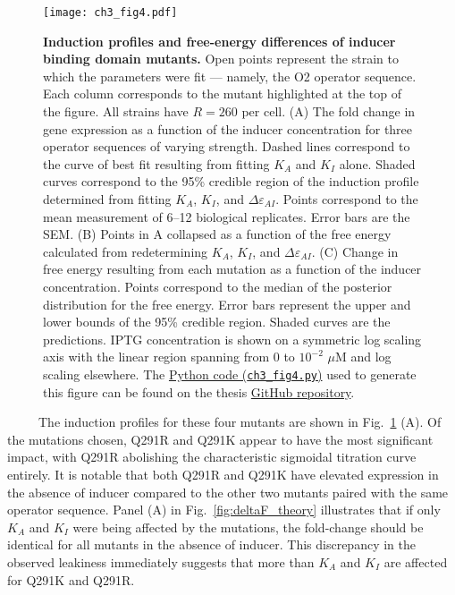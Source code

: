 \documentclass[12pt]{caltech_thesis}
\begin{document}
\hypertarget{fig:IND_muts}{%
\begin{figure}
\centering
\texttt{[image: ch3\_fig4.pdf]}
\caption[{Induction profiles and free-energy differences of inducer
binding domain mutants.}]{\textbf{Induction profiles and free-energy
differences of inducer binding domain mutants.} Open points represent
the strain to which the parameters were fit --- namely, the O2 operator
sequence. Each column corresponds to the mutant highlighted at the top
of the figure. All strains have \(R = 260\) per cell. (A) The fold
change in gene expression as a function of the inducer concentration for
three operator sequences of varying strength. Dashed lines correspond to
the curve of best fit resulting from fitting \(K_A\) and \(K_I\) alone.
Shaded curves correspond to the 95\% credible region of the induction
profile determined from fitting \(K_A\), \(K_I\), and
\(\Delta\varepsilon_{AI}\). Points correspond to the mean measurement of
6--12 biological replicates. Error bars are the SEM. (B) Points in A
collapsed as a function of the free energy calculated from redetermining
\(K_A\), \(K_I\), and \(\Delta\varepsilon_{AI}\). (C) Change in free
energy resulting from each mutation as a function of the inducer
concentration. Points correspond to the median of the posterior
distribution for the free energy. Error bars represent the upper and
lower bounds of the 95\% credible region. Shaded curves are the
predictions. IPTG concentration is shown on a symmetric log scaling axis
with the linear region spanning from 0 to \(10^{-2}\) \(\mu\)M and log
scaling elsewhere. The
\href{https://github.com/gchure/phd/blob/master/src/chapter_03/code/ch3_fig4.py}{Python
code (\texttt{ch3\_fig4.py})} used to generate this figure can be found
on the thesis \href{https://github.com/gchure/phd}{GitHub repository}.}
\label{fig:IND_muts}
\end{figure}
}

~~~~~The induction profiles for these four mutants are shown in
Fig.~\ref{fig:IND_muts} (A). Of the mutations chosen, Q291R and Q291K
appear to have the most significant impact, with Q291R abolishing the
characteristic sigmoidal titration curve entirely. It is notable that
both Q291R and Q291K have elevated expression in the absence of inducer
compared to the other two mutants paired with the same operator
sequence. Panel (A) in Fig.~\ref{fig:deltaF_theory} illustrates that if
only \(K_A\) and \(K_I\) were being affected by the mutations, the
fold-change should be identical for all mutants in the absence of
inducer. This discrepancy in the observed leakiness immediately suggests
that more than \(K_A\) and \(K_I\) are affected for Q291K and Q291R.
\end{document}
